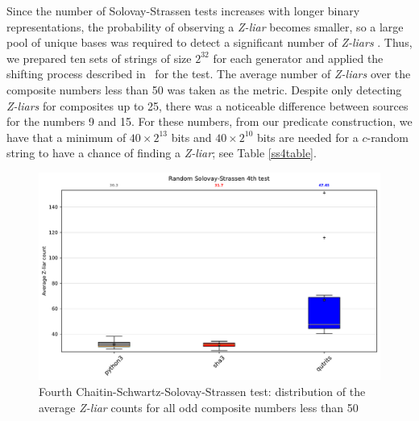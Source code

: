 \documentclass[l1pt]{elsarticle}
\begin{document}
Since the number of Solovay-Strassen tests increases with longer binary representations, the probability of observing a \emph{Z-liar} becomes smaller, so a large pool of unique bases was required to detect a significant number of \emph{Z-liars} \cite{abbott2018experimentally}. Thus, we prepared ten sets of strings of size $2^{32}$ for each generator and applied the shifting process described in~\cite{abbott2018experimentally} for the test.
The average number of \emph{Z-liars} over the composite numbers less than 50 was taken as the metric. Despite only detecting \emph{Z-liars} for composites up to 25, there was a noticeable difference between sources for the numbers 9 and 15. For these numbers, from our predicate construction, we have that a minimum of $40\times 2^{13}$ bits and $40\times 2^{10}$ bits are needed for a $c$-random string to have a chance of finding a \emph{Z-liar}; see Table \ref{ss4table}.




\begin{table}
\centering
{}
\caption{Average number of \emph{Z-liars} sampled by composite number tested (over 10 strings of length $2^{32}$)}
\label{ss4table}
\end{table}


\begin{figure}[H]
    \centering
    \includegraphics[width=\textwidth]{2023-how_real_is_incomputability_in_physics-ss4_boxplot_2023.pdf}
    \caption{Fourth Chaitin-Schwartz-Solovay-Strassen test: distribution of the average \emph{Z-liar} counts for all odd composite numbers less than 50}
    \label{ss4box}
\end{figure}
\end{document}
